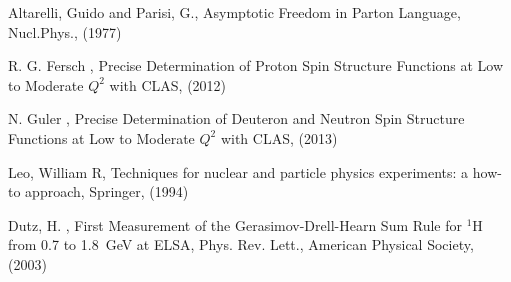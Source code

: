       Altarelli, Guido and Parisi, G.,
      Asymptotic Freedom in Parton Language,
      Nucl.Phys., (1977) 

	R. G. Fersch \etal, Precise Determination of Proton Spin Structure Functions at Low to Moderate $Q^2$ with CLAS, (2012)

	N. Guler \etal, Precise Determination of Deuteron and Neutron Spin Structure Functions at Low to Moderate $Q^2$ with CLAS, (2013)


        Leo, William R, Techniques for nuclear and particle physics experiments: a how-to approach, Springer, (1994)


        Dutz, H. \etal, First Measurement of the Gerasimov-Drell-Hearn Sum Rule for $^{1}\mathrm{H}$ from 0.7 to 1.8~GeV at ELSA,
        Phys. Rev. Lett., American Physical Society, (2003)

